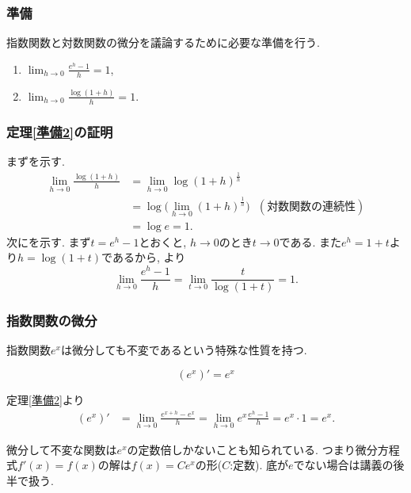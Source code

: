 \begin{frame}
\frametitle{準備}

指数関数と対数関数の微分を議論するために必要な準備を行う. 

\begin{Thm} \label{準備2}
\begin{enumerate}
\item $\displaystyle \lim_{h \to 0} \frac{e^h-1}{h}=1$, 
\item  $\displaystyle \lim_{h \to 0} \frac{\log(1+h)}{h}=1$. 
\end{enumerate}
\end{Thm}


\end{frame}





\begin{frame}
\frametitle{定理\ref{準備2}の証明}

まずを示す. 
\begin{align*} 
\lim_{h \to 0} \frac{\log(1+h)}{h} & = \lim_{h \to 0} \log(1+h)^{\frac{1}{h}} \\
& = \log \big( \lim_{h \to 0} (1+h)^{\frac{1}{h}} \big) \ \ \ (\text{対数関数の連続性})\\
& = \log e = 1. 
\end{align*}
次にを示す. 
まず$t=e^h-1$とおくと, $h\to 0$のとき$t\to0$である. 
また$e^h=1+t$より$h=\log (1+t)$であるから, より
$$
\lim_{h \to 0} \frac{e^h-1}{h}=\lim_{t \to 0} \frac{t}{\log(1+t)}=1. 
$$

\end{frame}




\begin{frame}
\frametitle{指数関数の微分}

 指数関数$e^x$は微分しても不変であるという特殊な性質を持つ. 

\begin{Thm} 
$$(e^x)'=e^x$$
\end{Thm}

定理\ref{準備2}より
\begin{align*} 
(e^x)' &= \lim_{h\to0}\frac{e^{x+h}-e^x}{h}=\lim_{h\to0}e^x \frac{e^h-1}{h}=e^x\cdot 1 = e^x. 
\end{align*}

微分して不変な関数は$e^x$の定数倍しかないことも知られている. 
つまり微分方程式$f'(x)=f(x)$の解は$f(x)=Ce^x$の形($C$:定数). 
底が$e$でない場合は講義の後半で扱う. 

\end{frame}



